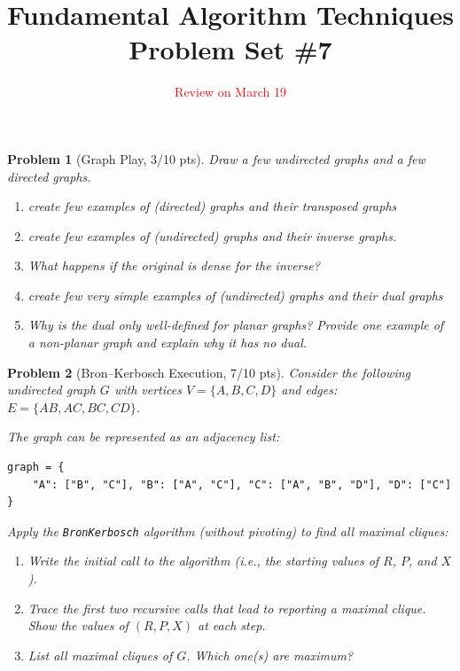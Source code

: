 \documentclass[11pt]{article}
\title{\textbf{Fundamental Algorithm Techniques} \\ Problem Set \#7} %
\date{\textcolor{red}{Review on March 19}} %
\newtheorem{problem}{Problem}
\begin{document}
\maketitle



\begin{problem}[Graph Play, 3/10 pts]
Draw a few undirected graphs and a few directed graphs.
\begin{enumerate}
    \item create few examples of (directed) graphs and their transposed graphs
    \item create few examples of (undirected) graphs and their inverse graphs. 
    \item What happens if the original is dense for the inverse? 
    \item create few very simple examples of (undirected) graphs and their dual graphs
    \item Why is the dual only well-defined for planar graphs? Provide one example of a non-planar graph and explain why it has no dual.
\end{enumerate}
\end{problem}


\begin{problem}[Bron–Kerbosch Execution, 7/10 pts]
Consider the following undirected graph $G$ with vertices $V = \{A, B, C, D\}$ and edges:  
$E = \{AB, AC, BC, CD\}$.

\begin{center}
\end{center}

The graph can be represented as an adjacency list:
\begin{verbatim}
graph = {
    "A": ["B", "C"], "B": ["A", "C"], "C": ["A", "B", "D"], "D": ["C"]
}
\end{verbatim}

Apply the \texttt{BronKerbosch} algorithm (without pivoting) to find all maximal cliques:

\begin{enumerate}
    \item Write the initial call to the algorithm (i.e., the starting values of $R$, $P$, and $X$).
    \item Trace the first two recursive calls that lead to reporting a maximal clique. Show the values of $(R, P, X)$ at each step.
    \item List all maximal cliques of $G$. Which one(s) are maximum?
\end{enumerate}


\end{problem}
\end{document}
